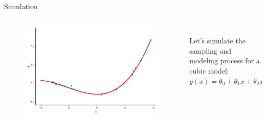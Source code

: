 \documentclass[aspectratio=169]{../latex_main/tntbeamer}  %
\begin{document}
	
	\begin{frame}[c]{Simulation}
	  \begin{columns}
	      \begin{column}{.6\textwidth}
	           \begin{figure}
	               \includegraphics[scale=.5]{Bild11}
	           \end{figure} 
	      \end{column}
	      
	      \begin{column}{.4\textwidth}
	      \\
	      \bigskip
	      \bigskip
	      \bigskip
	            Let’s simulate the sampling and modeling process for a \alert{cubic model}:\\
	            $g(x) = \theta_0 + \theta_1x + \theta_2x^2 + \theta_3x^3$
	      \end{column}
	  \end{columns}
	\end{frame}
	
	
	
\end{document}
